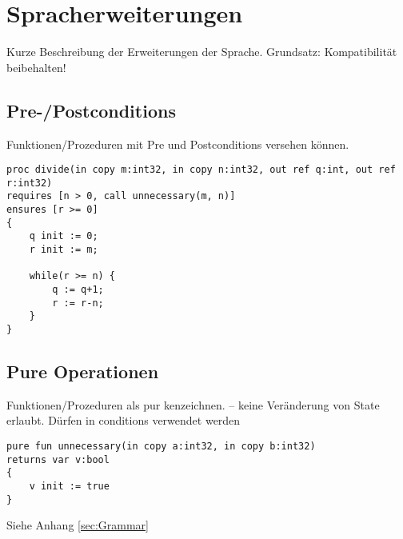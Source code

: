 \section{Spracherweiterungen}

Kurze Beschreibung der Erweiterungen der Sprache. Grundsatz: Kompatibilität beibehalten!

\subsection{Pre-/Postconditions}
Funktionen/Prozeduren mit Pre und Postconditions versehen können.


\begin{lstlisting}[caption=Definieren von pre-/postconditions]
proc divide(in copy m:int32, in copy n:int32, out ref q:int, out ref r:int32)
requires [n > 0, call unnecessary(m, n)]
ensures [r >= 0]
{
    q init := 0;
    r init := m;

    while(r >= n) {
        q := q+1;
        r := r-n;
    }
}
\end{lstlisting}



\subsection{Pure Operationen}
Funktionen/Prozeduren als pur kenzeichnen. -- keine Veränderung von State erlaubt. Dürfen in conditions verwendet werden
\begin{lstlisting}[caption=Pure Operationen]
pure fun unnecessary(in copy a:int32, in copy b:int32)
returns var v:bool 
{
    v init := true
}
\end{lstlisting}

Siehe Anhang \ref{sec:Grammar}




